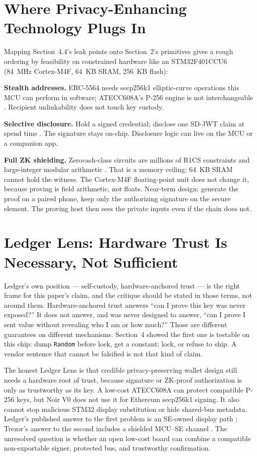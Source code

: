 \documentclass[10pt]{article}
\begin{document}
\section{Where Privacy-Enhancing Technology Plugs In}

Mapping Section~4.4's leak points onto Section~2's primitives gives a rough ordering by feasibility on constrained hardware like an STM32F401CCU6 (84~MHz Cortex-M4F, 64~KB SRAM, 256~KB flash):

\textbf{Stealth addresses.} ERC-5564 needs secp256k1 elliptic-curve operations this MCU can perform in software; ATECC608A's P-256 engine is not interchangeable \cite{erc5564}. Recipient unlinkability does not touch key custody.

\textbf{Selective disclosure.} Hold a signed credential; disclose one SD-JWT claim at spend time \cite{sdjwt2025}. The signature stays on-chip. Disclosure logic can live on the MCU or a companion app.

\textbf{Full ZK shielding.} Zerocash-class circuits are millions of R1CS constraints and large-integer modular arithmetic \cite{zerocash2014}. That is a memory ceiling: 64~KB SRAM cannot hold the witness. The Cortex-M4F floating-point unit does not change it, because proving is field arithmetic, not floats. Near-term design: generate the proof on a paired phone, keep only the authorizing signature on the secure element. The proving host then sees the private inputs even if the chain does not.

\section{Ledger Lens: Hardware Trust Is Necessary, Not Sufficient}

Ledger's own position --- self-custody, hardware-anchored trust --- is the right frame for this paper's claim, and the critique should be stated in those terms, not around them. Hardware-anchored trust answers ``can I prove this key was never exposed?'' It does not answer, and was never designed to answer, ``can I prove I sent value without revealing who I am or how much?'' Those are different guarantees on different mechanisms. Section~4 showed the first one is testable on this chip: dump \texttt{Random} before lock, get a constant; lock, or refuse to ship. A vendor sentence that cannot be falsified is not that kind of claim.

The honest Ledger Lens is that credible privacy-preserving wallet design still needs a hardware root of trust, because signature or ZK-proof authorization is only as trustworthy as its key. A low-cost ATECC608A can protect compatible P-256 keys, but Noir V0 does not use it for Ethereum secp256k1 signing. It also cannot stop malicious STM32 display substitution or hide shared-bus metadata. Ledger's published answer to the first problem is an SE-owned display path \cite{ledger-hw,ledger-nanox}; Trezor's answer to the second includes a shielded MCU--SE channel \cite{trezor-se,optiga-shield}. The unresolved question is whether an open low-cost board can combine a compatible non-exportable signer, protected bus, and trustworthy confirmation.
\end{document}
